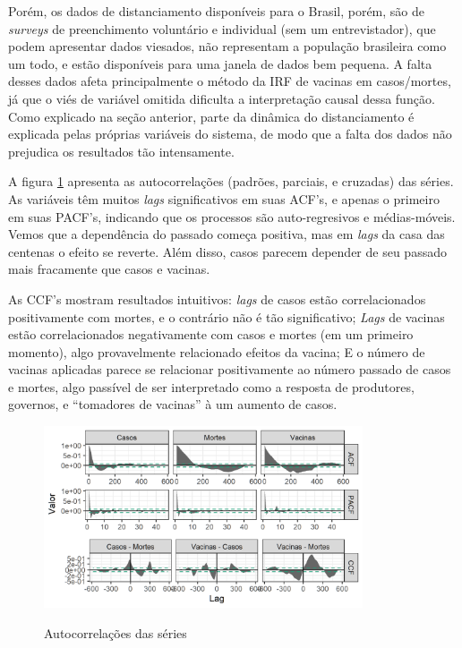 \documentclass[
	12pt,				%
	oneside,			%
	a4paper,			%
	english,			%
	brazil				%
	hyperref = {colorlinks, citecolor=c1d, linkcolor=c2d, urlcolor=c3d, colorlinks}
	]{abntex2}
\newcounter{j}
\begin{document}
Porém, os dados de distanciamento disponíveis para o Brasil, porém, são de \textit{surveys} de preenchimento voluntário e individual (sem um entrevistador), que podem apresentar dados viesados, não representam a população brasileira como um todo, e estão disponíveis para uma janela de dados bem pequena. A falta desses dados afeta principalmente o método da IRF de vacinas em casos/mortes, já que o viés de variável omitida dificulta a interpretação causal dessa função. Como explicado na seção anterior, parte da dinâmica do distanciamento é explicada pelas próprias variáveis do sistema, de modo que a falta dos dados não prejudica os resultados tão intensamente.

A figura \ref{fig:acfall} apresenta as autocorrelações (padrões, parciais, e cruzadas) das séries. As variáveis têm muitos \textit{lags} significativos em suas ACF's, e apenas o primeiro em suas PACF's, indicando que os processos são auto-regresivos e médias-móveis. Vemos que a dependência do passado começa positiva, mas em \textit{lags} da casa das centenas o efeito se reverte. Além disso, casos parecem depender de seu passado mais fracamente que casos e vacinas.

As CCF's mostram resultados intuitivos: \textit{lags} de casos estão correlacionados positivamente com mortes, e o contrário não é tão significativo; \textit{Lags} de vacinas estão correlacionados negativamente com casos e mortes (em um primeiro momento), algo provavelmente relacionado efeitos da vacina; E o número de vacinas aplicadas parece se relacionar positivamente ao número passado de casos e mortes, algo passível de ser interpretado como a resposta de produtores, governos, e ``tomadores de vacinas'' à um aumento de casos.

\begin{figure}[H]
    \centering
    \caption{Autocorrelações das séries}
    \includegraphics[width = 0.84\textwidth]{Figuras/acfall.png}
    \label{fig:acfall}
\end{figure}
\end{document}
